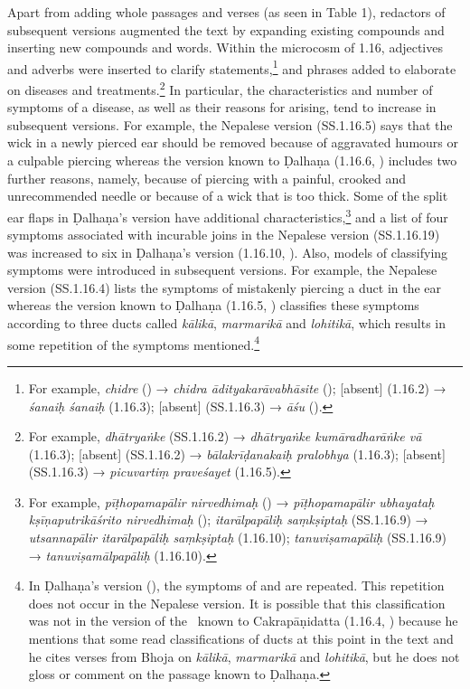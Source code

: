 Apart from adding whole passages and verses (as seen in Table 1), redactors of subsequent 
versions augmented the text by expanding existing compounds and inserting new 
compounds and words. Within the microcosm of 1.16, adjectives and adverbs were inserted 
to clarify statements,\footnote{For example, \emph{chidre} () → 
\emph{chidra ādityakarāvabhāsite} (); [absent] 
(1.16.2) 
→ 
\emph{śanaiḥ śanaiḥ} (1.16.3);  [absent] (SS.1.16.3) → \emph{āśu} 
().} and phrases added to elaborate on diseases and 
treatments.\footnote{For example, \emph{dhātryaṅke} (SS.1.16.2) → \emph{dhātryaṅke 
kumāradharāṅke vā} (1.16.3); [absent] (SS.1.16.2) → 
\emph{bālakrīḍanakaiḥ pralobhya} (1.16.3);  [absent] (SS.1.16.3) → 
\emph{picuvartiṃ praveśayet} (1.16.5).} In particular, the characteristics 
and number of symptoms of a disease, as well as their reasons for arising, tend to increase in 
subsequent versions. For example, the Nepalese version (SS.1.16.5) says that the wick in a 
newly pierced ear should be removed because of aggravated humours or a culpable piercing 
whereas the version known to Ḍalhaṇa (1.16.6, \cite[77]{vulgate}) includes two further 
reasons, namely, because of piercing with a painful, crooked and unrecommended needle or 
because of a wick that is too thick. Some of the split ear flaps in Ḍalhaṇa's version have 
additional characteristics,\footnote{For example, \emph{pīṭhopamapālir nirvedhimaḥ} 
() → \emph{pīṭhopamapālir ubhayataḥ kṣīṇaputrikāśrito 
nirvedhimaḥ} (); \emph{itarālpapāliḥ saṃkṣiptaḥ} (SS.1.16.9) → 
\emph{utsannapālir 
itarālpapāliḥ saṃkṣiptaḥ} (1.16.10); \emph{tanuviṣamapāliḥ} (SS.1.16.9) 
→ \emph{tanuviṣamālpapāliḥ} (1.16.10).} and a list of four symptoms 
associated with incurable joins in the Nepalese version (SS.1.16.19) was increased to six in 
Ḍalhaṇa's version (1.16.10, \cite[77]{vulgate}). Also, models of classifying symptoms were 
introduced in subsequent versions. For example, the Nepalese version (SS.1.16.4) lists the 
symptoms of mistakenly piercing a duct in the ear whereas the version known to Ḍalhaṇa 
(1.16.5, \cite[76–77]{vulgate}) classifies these symptoms according to three ducts called 
\emph{kālikā}, \emph{marmarikā} and \emph{lohitikā}, which results in some repetition of 
the symptoms mentioned.\footnote{In Ḍalhaṇa's version  (), the 
symptoms of  and  are repeated. This repetition does 
not occur in the Nepalese version. It is possible that this classification was not in the version 
of the \SS\ known to Cakrapāṇidatta (1.16.4, \cite[126]{acar-1939}) because he mentions 
that some read classifications of ducts at this point in the text and he cites verses from Bhoja 
on \emph{kālikā}, \emph{marmarikā} and \emph{lohitikā}, but he does not gloss or 
comment on the passage known to Ḍalhaṇa.}

